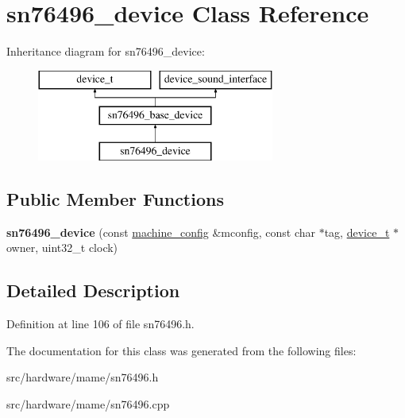 \hypertarget{classsn76496__device}{\section{sn76496\-\_\-device Class Reference}
\label{classsn76496__device}
}
Inheritance diagram for sn76496\-\_\-device\-:\begin{figure}[H]
\begin{center}
\leavevmode
\includegraphics[height=3.000000cm]{classsn76496__device}
\end{center}
\end{figure}
\subsection*{Public Member Functions}
\begin{DoxyCompactItemize}
\item 
\hypertarget{classsn76496__device_adc168109c27e065d683800243c49f739}{{\bfseries sn76496\-\_\-device} (const \hyperlink{structmachine__config}{machine\-\_\-config} \&mconfig, const char $\ast$tag, \hyperlink{classdevice__t}{device\-\_\-t} $\ast$owner, uint32\-\_\-t clock)}\label{classsn76496__device_adc168109c27e065d683800243c49f739}

\end{DoxyCompactItemize}


\subsection{Detailed Description}


Definition at line 106 of file sn76496.\-h.



The documentation for this class was generated from the following files\-:\begin{DoxyCompactItemize}
\item 
src/hardware/mame/sn76496.\-h\item 
src/hardware/mame/sn76496.\-cpp\end{DoxyCompactItemize}
